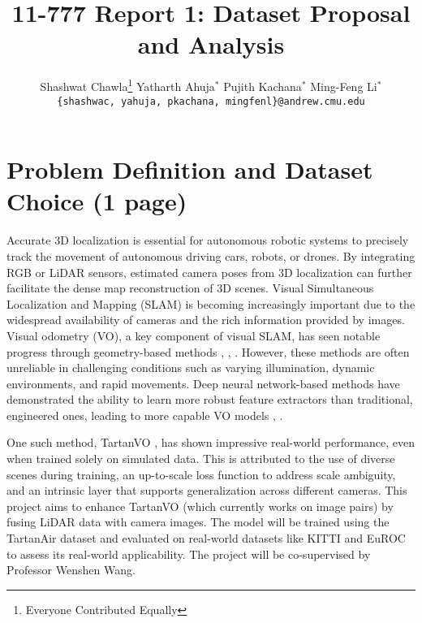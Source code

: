 \documentclass[11pt,a4paper]{article}
\title{11-777 Report 1: Dataset Proposal and Analysis}
\author{
  Shashwat Chawla\thanks{\hspace{4pt}Everyone Contributed Equally} \hspace{2em} Yatharth Ahuja$^*$ \hspace{2em} Pujith Kachana$^*$ \hspace{2em} Ming-Feng Li$^*$ \\
  \texttt{\{shashwac, yahuja, pkachana, mingfenl\}@andrew.cmu.edu}
  }
\date{}
\begin{document}
\maketitle

\section{Problem Definition and Dataset Choice (1 page)}
Accurate 3D localization is essential for autonomous robotic systems to precisely track the movement of autonomous driving cars, robots, or drones. By integrating RGB or LiDAR sensors, estimated camera poses from 3D localization can further facilitate the dense map reconstruction of 3D scenes. Visual Simultaneous Localization and Mapping (SLAM) is becoming increasingly important due to the widespread availability of cameras and the rich information provided by images. Visual odometry (VO), a key component of visual SLAM, has seen notable progress through geometry-based methods \cite{lsd-slam}, \cite{orb-slam}, \cite{spa-odom}. However, these methods are often unreliable in challenging conditions such as varying illumination, dynamic environments, and rapid movements. Deep neural network-based methods have demonstrated the ability to learn more robust feature extractors than traditional, engineered ones, leading to more capable VO models \cite{vo-dnn}, \cite{sfm-net}. 

One such method, TartanVO \cite{tartanvo2020corl}, has shown impressive real-world performance, even when trained solely on simulated data. This is attributed to the use of diverse scenes during training, an up-to-scale loss function to address scale ambiguity, and an intrinsic layer that supports generalization across different cameras. This project aims to enhance TartanVO (which currently works on image pairs) by fusing LiDAR data with camera images. The model will be trained using the TartanAir dataset and evaluated on real-world datasets like KITTI and EuROC to assess its real-world applicability. The project will be co-supervised by Professor Wenshen Wang.
\end{document}
